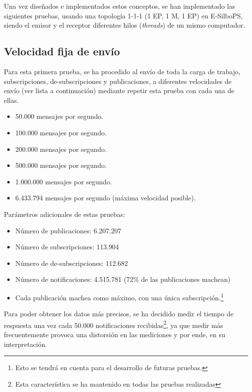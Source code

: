 Una vez diseñados e implementados estos conceptos, se han implementado las 
siguientes pruebas, usando una topología 1-1-1 (1 EP, 1 M, 1 EP) en E-SilboPS,
siendo el emisor y el receptor diferentes hilos (\textit{threads}) de un mismo
computador.


\subsection{Velocidad fija de envío} \label{ssct:desarrollo_pruebas-esilbops_test-fixed}

Para esta primera prueba, se ha procedido al envío de toda la carga de trabajo,
subscripciones, de-subscripciones y publicaciones, a diferentes velocidades
de envío (ver lista a continuación) mediante repetir esta prueba con cada una
de ellas.

\begin{itemize}
    \item 50.000 mensajes por segundo.
    \item 100.000 mensajes por segundo.
    \item 200.000 mensajes por segundo.
    \item 500.000 mensajes por segundo.
    \item 1.000.000 mensajes por segundo.
    \item 6.433.794 mensajes por segundo (máxima velocidad posible).
\end{itemize}

Parámetros adicionales de estas pruebas:
\begin{itemize}
    \item Número de publicaciones: 6.207.207
    \item Número de subscripciones: 113.904
    \item Número de de-subscripciones: 112.682
    \item Número de notificaciones: 4.515.781 (72\% de las publicaciones machean)
    \item Cada publicación machea como máximo, con una única subscripción.\footnote{Esto
    se tendrá en cuenta para el desarrollo de futuras pruebas.}
\end{itemize}

Para poder obtener los datos más precisos, se ha decidido medir el tiempo de respuesta una vez cada 
50.000 notificaciones recibidas\footnote{Esta característica se ha mantenido en todas las pruebas 
realizadas}, ya que medir más frecuentemente provoca una distorsión en las mediciones y por
ende, en su interpretación.

